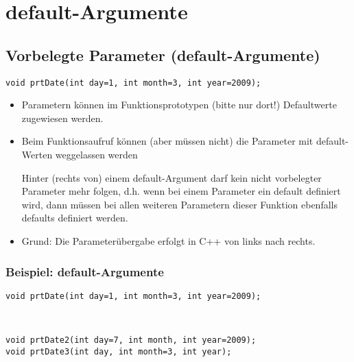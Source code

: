 \section{default-Argumente}

\subsection{Vorbelegte Parameter (default-Argumente)}
\begin{minipage}{0.65\linewidth}
\vspace{-\baselineskip}
\begin{lstlisting}
void prtDate(int day=1, int month=3, int year=2009);
\end{lstlisting}
\end{minipage}
\normalsize
\begin{itemize}
	\item Parametern können im Funktionsprototypen (\color{red}bitte nur dort!\color{black}) Defaultwerte zugewiesen werden.
	\item Beim Funktionsaufruf können (aber müssen nicht) die Parameter mit default-Werten weggelassen werden\\
	\begin{achtung}Hinter (rechts von) einem default-Argument darf kein nicht vorbelegter Parameter mehr folgen, d.h. wenn bei einem Parameter ein default definiert wird, dann müssen bei allen weiteren Parametern dieser Funktion ebenfalls defaults definiert werden.
	\end{achtung}
	\item Grund: Die Parameterübergabe erfolgt in C++ von links nach rechts.
\end{itemize}

\subsubsection{Beispiel: default-Argumente}
\begin{minipage}{\linewidth}
\vspace{-\baselineskip}
\begin{lstlisting}
void prtDate(int day=1, int month=3, int year=2009);
\end{lstlisting}
\end{minipage}
\\
\begin{minipage}{0.65\linewidth}
\begin{lstlisting}
void prtDate2(int day=7, int month, int year=2009);
void prtDate3(int day, int month=3, int year);
\end{lstlisting}
\end{minipage}

